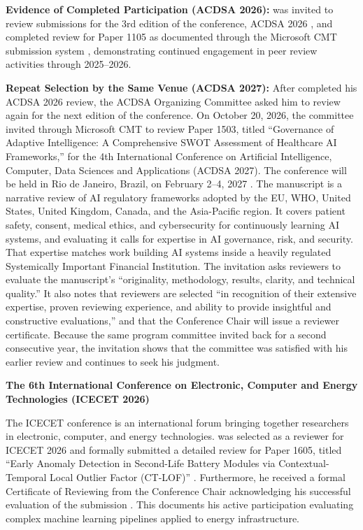 \textbf{Evidence of Completed Participation (ACDSA 2026):} \dr was invited to review submissions for the 3rd edition of the conference, ACDSA 2026 \cite{JR8}, and completed review for Paper 1105 as documented through the Microsoft CMT submission system \cite{JR9}, demonstrating continued engagement in peer review activities through 2025--2026.

\textbf{Repeat Selection by the Same Venue (ACDSA 2027):} After \dr completed his ACDSA 2026 review, the ACDSA Organizing Committee asked him to review again for the next edition of the conference. On October 20, 2026, the committee invited \dr through Microsoft CMT to review Paper 1503, titled ``Governance of Adaptive Intelligence: A Comprehensive SWOT Assessment of Healthcare AI Frameworks,'' for the 4th International Conference on Artificial Intelligence, Computer, Data Sciences and Applications (ACDSA 2027). The conference will be held in Rio de Janeiro, Brazil, on February 2--4, 2027 \cite{JR46}. The manuscript is a narrative review of AI regulatory frameworks adopted by the EU, WHO, United States, United Kingdom, Canada, and the Asia-Pacific region. It covers patient safety, consent, medical ethics, and cybersecurity for continuously learning AI systems, and evaluating it calls for expertise in AI governance, risk, and security. That expertise matches \drs work building AI systems inside a heavily regulated Systemically Important Financial Institution. The invitation asks reviewers to evaluate the manuscript's ``originality, methodology, results, clarity, and technical quality.'' It also notes that reviewers are selected ``in recognition of their extensive expertise, proven reviewing experience, and ability to provide insightful and constructive evaluations,'' and that the Conference Chair will issue a reviewer certificate. Because the same program committee invited \dr back for a second consecutive year, the invitation shows that the committee was satisfied with his earlier review and continues to seek his judgment.

\textbf{The 6th International Conference on Electronic, Computer and Energy Technologies (ICECET 2026)}

The ICECET conference is an international forum bringing together researchers in electronic, computer, and energy technologies. \dr was selected as a reviewer for ICECET 2026 \cite{JR28} and formally submitted a detailed review for Paper 1605, titled ``Early Anomaly Detection in Second-Life Battery Modules via Contextual-Temporal Local Outlier Factor (CT-LOF)'' \cite{JR29}. Furthermore, he received a formal Certificate of Reviewing from the Conference Chair acknowledging his successful evaluation of the submission \cite{JR30}. This documents his active participation evaluating complex machine learning pipelines applied to energy infrastructure.

